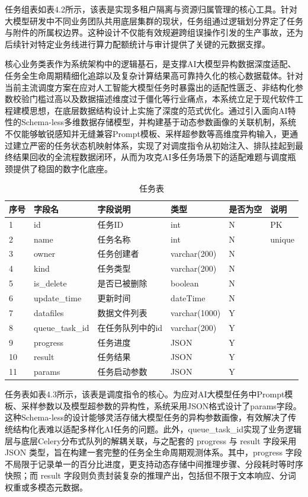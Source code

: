 任务组表如表4.2所示，该表是实现多租户隔离与资源归属管理的核心工具。针对大模型研发中不同业务团队共用底层集群的现状，任务组通过逻辑划分界定了任务与附件的所属权边界。这种设计不仅能有效规避跨组误操作引发的生产事故，还为后续针对特定业务线进行算力配额统计与审计提供了关键的元数据支撑。

核心业务类表作为系统架构中的逻辑基石，是支撑AI大模型异构数据深度适配、任务全生命周期精细化追踪以及复杂计算结果高可靠持久化的核心数据载体。针对当前主流调度方案在应对人工智能大模型任务时暴露出的适配性匮乏、非结构化参数校验门槛过高以及数据描述维度过于僵化等行业痛点，本系统立足于现代软件工程建模思想，在底层数据结构设计上实施了深度的范式优化。通过引入面向AI特性的Schema-less多维数据存储模型，并构建基于动态参数画像的关联机制，系统不仅能够敏锐感知并无缝兼容Prompt模板、采样超参数等高维度异构输入，更通过建立严密的任务状态机映射体系，实现了对调度指令从初始注入、排队挂起到最终结果回收的全流程数据闭环，从而为攻克AI多任务场景下的适配难题与调度瓶颈提供了稳固的数字化底座。

\begin{table}[htbp]
    \centering
    \caption{任务表}
    \begin{tabular}{llllll}
        \toprule
序号 & 字段名 & 字段说明 & 类型 & 是否为空 & 说明 \\
        \midrule
1 & id & 任务ID & int & N & PK \\
2 & name & 任务名称 & int & N & unique \\
3 & owner & 任务创建者 & varchar(200) & N &  \\
4 & kind & 任务类型 & varchar(200) & N &  \\
5 & is\_delete & 是否已被删除 & boolean & N &  \\
6 & update\_time & 更新时间 & dateTime & N &  \\
7 & datafiles & 数据文件列表 & varchar(1000) & Y &  \\
8 & queue\_task\_id & 在任务队列中的id & varchar(200) & Y &  \\
9 & progress & 任务进度 & JSON & Y &  \\
10 & result & 任务结果 & JSON & Y &  \\
11 & params & 任务启动参数 & JSON & Y &  \\
        \bottomrule
    \end{tabular}
    \label{tab:my_label}
\end{table}

任务表如表4.3所示，该表是调度指令的核心。为应对AI大模型任务中Prompt模板、采样参数以及模型超参数的异构性，系统采用JSON格式设计了params字段。这种Schema-less的设计能够灵活存储大模型任务的异构参数画像，有效解决了传统结构化表难以适配多样化AI任务的问题。此外，queue\_task\_id实现了业务逻辑层与底层Celery分布式队列的解耦关联，与之配套的 progress 与 result 字段采用JSON 类型，旨在构建一套完整的任务全生命周期观测体系。其中，progress 字段不局限于记录单一的百分比进度，更支持动态存储中间推理步骤、分段耗时等时序快照；而 result 字段则负责封装复杂的推理产出，包括但不限于文本响应、分词权重或多模态元数据。

